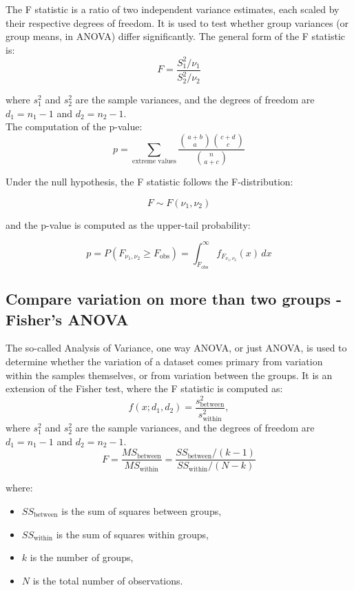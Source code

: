 \documentclass{book}
\begin{document}
The F statistic is a ratio of two independent variance estimates, each scaled by their respective degrees of freedom. It is used to test whether group variances (or group means, in ANOVA) differ significantly. The general form of the F statistic is:
\[
F = \frac{S_1^2 / \nu_1}{S_2^2 / \nu_2}
\]

where $s_1^{2}$ and $s_2^{2}$ are the sample variances, and the degrees of freedom are $d_1 = n_1 - 1$ and $d_2 = n_2 - 1$.\\

The computation of the p-value:
\[
p = \sum_{\text{extreme values}} \frac{\binom{a+b}{a} \binom{c+d}{c}}{\binom{n}{a+c}}
\]

Under the null hypothesis, the F statistic follows the F-distribution:

\[
F \sim F(\nu_1, \nu_2)
\]

and the p-value is computed as the upper-tail probability:

\[
p = P(F_{\nu_1, \nu_2} \geq F_{\text{obs}}) = \int_{F_{\text{obs}}}^{\infty} f_{F_{\nu_1, \nu_2}}(x)\,dx
\]

\newpage

\subsection{Compare variation on more than two groups - Fisher's ANOVA}

The so-called Analysis of Variance, one way ANOVA, or just ANOVA, is used to determine whether the variation of a dataset comes primary from variation within the samples themselves, or from variation between the groups. It is an extension of the Fisher test, where the F statistic is computed as:
\[
    f(x; d_{1}, d_{2}) = \frac{s_\text{between}^{2}}{s_\text{within}^{2}},
\]
where $s_1^{2}$ and $s_2^{2}$ are the sample variances, and the degrees of freedom are $d_1 = n_1 - 1$ and $d_2 = n_2 - 1$.\\


\[
F = \frac{MS_{\text{between}}}{MS_{\text{within}}} = \frac{SS_{\text{between}} / (k - 1)}{SS_{\text{within}} / (N - k)}
\]

where:
\begin{itemize}
  \item $SS_{\text{between}}$ is the sum of squares between groups,
  \item $SS_{\text{within}}$ is the sum of squares within groups,
  \item $k$ is the number of groups,
  \item $N$ is the total number of observations.
\end{itemize}
\end{document}
